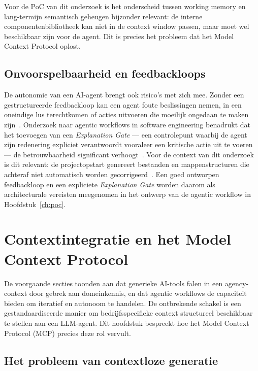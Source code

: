 Voor de PoC van dit onderzoek is het onderscheid tussen working memory en lang-termijn semantisch geheugen bijzonder relevant: de interne componentenbibliotheek kan niet in de context window passen, maar moet wel beschikbaar zijn voor de agent. Dit is precies het probleem dat het Model Context Protocol oplost.

\subsection{Onvoorspelbaarheid en feedbackloops}
\label{subsec:onvoorspelbaarheid}

De autonomie van een AI-agent brengt ook risico's met zich mee. Zonder een gestructureerde feedbackloop kan een agent foute beslissingen nemen, in een oneindige lus terechtkomen of acties uitvoeren die moeilijk ongedaan te maken zijn~\autocite{Rao2025}. Onderzoek naar agentic workflows in software engineering benadrukt dat het toevoegen van een \textit{Explanation Gate} --- een controlepunt waarbij de agent zijn redenering expliciet verantwoordt vooraleer een kritische actie uit te voeren --- de betrouwbaarheid significant verhoogt~\autocite{Rao2025}. Voor de context van dit onderzoek is dit relevant: de projectopstart genereert bestanden en mappenstructuren die achteraf niet automatisch worden gecorrigeerd~\autocite{Rao2025}. Een goed ontworpen feedbackloop en een expliciete \textit{Explanation Gate} worden daarom als architecturale vereisten meegenomen in het ontwerp van de agentic workflow in Hoofdstuk~\ref{ch:poc}.

\section{Contextintegratie en het Model Context Protocol}
\label{sec:mcp}

De voorgaande secties toonden aan dat generieke AI-tools falen in een agency-context door gebrek aan domeinkennis, en dat agentic workflows de capaciteit bieden om iteratief en autonoom te handelen. De ontbrekende schakel is een gestandaardiseerde manier om bedrijfsspecifieke context structureel beschikbaar te stellen aan een LLM-agent. Dit hoofdstuk bespreekt hoe het Model Context Protocol (MCP) precies deze rol vervult.

\subsection{Het probleem van contextloze generatie}
\label{subsec:contextloos}

